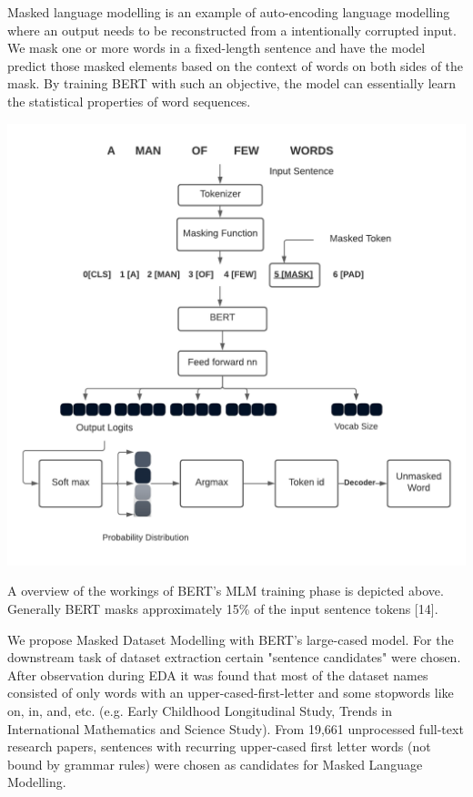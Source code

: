 \documentclass[twocolumn]{article}
\begin{document}
Masked language modelling is an example of auto-encoding language modelling where an output needs to be reconstructed from a intentionally corrupted input. We mask one or more words in a fixed-length sentence and have the model predict those masked elements based on the context of words on both sides of the mask. By training BERT with such an objective, the model can essentially learn the statistical properties of word sequences.

\begin{center}
\hspace*{-0.55cm}
\includegraphics[scale=0.24]{MLM.png} 
\end{center}

A overview of the workings of BERT's MLM training phase is depicted above. Generally BERT masks approximately 15\% of the input sentence tokens [14]. 

We propose Masked Dataset Modelling with BERT's large-cased model. For the downstream task of dataset extraction certain "sentence candidates" were chosen. After observation during EDA it was found that most of the dataset names consisted of only words with an upper-cased-first-letter and some stopwords like on, in, and, etc. (e.g. Early Childhood Longitudinal Study, Trends in International Mathematics and Science Study). From 19,661 unprocessed full-text research papers, sentences with recurring upper-cased first letter words (not bound by grammar rules) were chosen as candidates for Masked Language Modelling.
\end{document}
